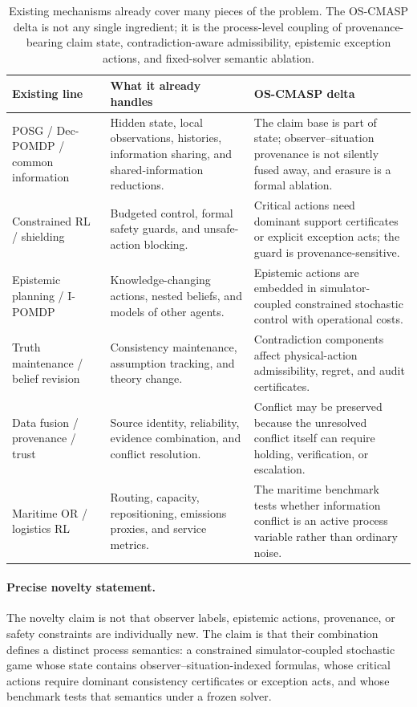 \documentclass[11pt]{article}
\newcommand{\1}{\mathbf{1}}
\theoremstyle{definition}
\theoremstyle{plain}
\theoremstyle{remark}
\begin{document}
\begin{table}[H]
\centering
\caption{Existing mechanisms already cover many pieces of the problem. The OS-CMASP delta is not any single ingredient; it is the process-level coupling of provenance-bearing claim state, contradiction-aware admissibility, epistemic exception actions, and fixed-solver semantic ablation.}
\label{tab:related-delta-expanded}
\footnotesize
\begin{tabularx}{\textwidth}{@{}L{0.24\textwidth}L{0.35\textwidth}X@{}}
\toprule
Existing line & What it already handles & OS-CMASP delta \\
\midrule
POSG / Dec-POMDP / common information & Hidden state, local observations, histories, information sharing, and shared-information reductions. & The claim base is part of state; observer--situation provenance is not silently fused away, and erasure is a formal ablation. \\
Constrained RL / shielding & Budgeted control, formal safety guards, and unsafe-action blocking. & Critical actions need dominant support certificates or explicit exception acts; the guard is provenance-sensitive. \\
Epistemic planning / I-POMDP & Knowledge-changing actions, nested beliefs, and models of other agents. & Epistemic actions are embedded in simulator-coupled constrained stochastic control with operational costs. \\
Truth maintenance / belief revision & Consistency maintenance, assumption tracking, and theory change. & Contradiction components affect physical-action admissibility, regret, and audit certificates. \\
Data fusion / provenance / trust & Source identity, reliability, evidence combination, and conflict resolution. & Conflict may be preserved because the unresolved conflict itself can require holding, verification, or escalation. \\
Maritime OR / logistics RL & Routing, capacity, repositioning, emissions proxies, and service metrics. & The maritime benchmark tests whether information conflict is an active process variable rather than ordinary noise. \\
\bottomrule
\end{tabularx}
\end{table}

\paragraph{Precise novelty statement.} The novelty claim is not that observer labels, epistemic actions, provenance, or safety constraints are individually new. The claim is that their combination defines a distinct process semantics: a constrained simulator-coupled stochastic game whose state contains observer--situation-indexed formulas, whose critical actions require dominant consistency certificates or exception acts, and whose benchmark tests that semantics under a frozen solver.
\end{document}
